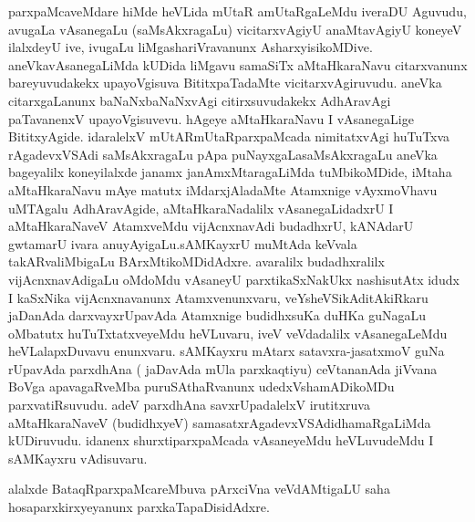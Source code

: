 \begin{artha}
parxpaMcaveMdare hiMde heVLida mUtaR amUtaRgaLeMdu iveraDU  Aguvudu,
avugaLa vAsanegaLu (saMsAkxragaLu) vicitarxvAgiyU anaMtavAgiyU
koneyeV ilalxdeyU ive, ivugaLu liMgashariVravanunx
AsharxyisikoMDive. aneVkavAsanegaLiMda kUDida liMgavu samaSiTx
aMtaHkaraNavu citarxvanunx bareyuvudakekx
upayoVgisuva BititxpaTadaMte vicitarxvAgiruvudu. aneVka citarxgaLanunx baNaNxbaNaNxvAgi
citirxsuvudakekx AdhAravAgi paTavanenxV upayoVgisuvevu. hAgeye
aMtaHkaraNavu I vAsanegaLige BititxyAgide. idaralelxV
mUtARmUtaRparxpaMcada nimitatxvAgi huTuTxva rAgadevxVSAdi
saMsAkxragaLu pApa puNayxgaLasaMsAkxragaLu aneVka bageyalilx
koneyilalxde janamx janAmxMtaragaLiMda tuMbikoMDide, iMtaha
aMtaHkaraNavu mAye matutx iMdarxjAladaMte Atamxnige vAyxmoVhavu
uMTAgalu AdhAravAgide, aMtaHkaraNadalilx vAsanegaLidadxrU I
aMtaHkaraNaveV AtamxveMdu vijAcnxnavAdi budadhxrU, kANAdarU gwtamarU
ivara anuyAyigaLu.\break sAMKayxrU muMtAda keVvala  takARvaliMbigaLu
BArxMtikoMDidAdxre. avaralilx budadhxralilx vijAcnxnavAdigaLu oMdoMdu
vAsaneyU parxtikaSxNakUkx nashisutAtx idudx I kaSxNika vijAcnxnavanunx
Atamxvenunxvaru, veYsheVSikAditAkiRkaru jaDanAda darxvayxrUpavAda
Atamxnige budidhxsuKa duHKa guNagaLu oMbatutx huTuTxtatxveyeMdu
heVLuvaru, iveV veVdadalilx vAsanegaLeMdu heVLalapxDuvavu
enunxvaru. sAMKayxru mAtarx satavxra-jasatxmoV guNa rUpavAda
parxdhAna ( jaDavAda mUla parxkaqtiyu) ceVtananAda jiVvana BoVga
apavagaRveMba puruSAthaRvanunx udedxVshamADikoMDu
parxvatiRsuvudu. adeV parxdhAna savxrUpadalelxV irutitxruva
aMtaHkaraNaveV (budidhxyeV) samasatxrAgadevxVSAdidhamaRgaLiMda
kUDiruvudu. idanenx shurxti\break parxpaMcada vAsaneyeMdu heVLuvudeMdu I
sAMKayxru vAdisuvaru.

alalxde BataqRparxpaMcareMbuva pArxciVna veVdAMtigaLU saha
hosaparxkirxyeyanunx parxkaTapaDisidAdxre.
\end{artha}

\centerline{}

